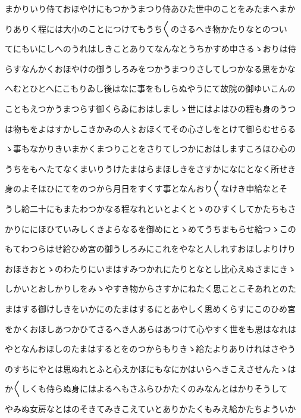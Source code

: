 \documentclass[a4paper,11pt,landscape]{ltjtarticle}
\begin{document}
\par\medskip
まかりいり侍ておほやけにもつかうまつり侍あひた世中のことをみたまへまか
\par\medskip
りありく程には大小のことにつけてもうち〱のさるへき物かたりなとのつい
\par\medskip
てにもいにしへのうれはしきことありてなんなとうちかすめ申さるゝおりは侍
\par\medskip
らすなんかくおほやけの御うしろみをつかうまつりさしてしつかなる思をかな
\par\medskip
へむとひとへにこもりゐし後はなに事をもしらぬやうにて故院の御ゆいこんの
\par\medskip
こともえつかうまつらす御くらゐにおはしましゝ世にはよはひの程も身のうつ
\par\medskip
は物もをよはすかしこきかみの人〻おほくてその心さしをとけて御らむせらる
\par\medskip
ゝ事もなかりきいまかくまつりことをさりてしつかにおはしますころほひ心の
\par\medskip
うちをもへたてなくまいりうけたまはらまほしきをさすかになにとなく所せき
\par\medskip
身のよそほひにてをのつから月日をすくす事となんおり〱なけき申給なとそ
\par\medskip
うし給二十にもまたわつかなる程なれといとよくとゝのひすくしてかたちもさ
\par\medskip
かりににほひていみしくきよらなるを御めにとゝめてうちまもらせ給つゝこの
\par\medskip
もてわつらはせ給ひめ宮の御うしろみにこれをやなと人しれすおほしよりけり
\par\medskip
おほきおとゝのわたりにいまはすみつかれにたりとなとし比心えぬさまにきゝ
\par\medskip
しかいとおしかりしをみゝやすき物からさすかにねたく思ことこそあれとのた
\par\medskip
まはする御けしきをいかにのたまはするにとあやしく思めくらすにこのひめ宮
\par\medskip
をかくおほしあつかひてさるへき人あらはあつけて心やすく世をも思はなれは
\par\medskip
やとなんおほしのたまはするとをのつからもりきゝ給たよりありけれはさやう
\par\medskip
のすちにやとは思ぬれとふと心えかほにもなにかはいらへきこえさせんたゝは
\par\medskip
か〱しくも侍らぬ身にはよるへもさふらひかたくのみなんとはかりそうして
\par\medskip
やみぬ女房なとはのそきてみきこえていとありかたくもみえ給かたちよういか
\par\medskip
\end{document}
